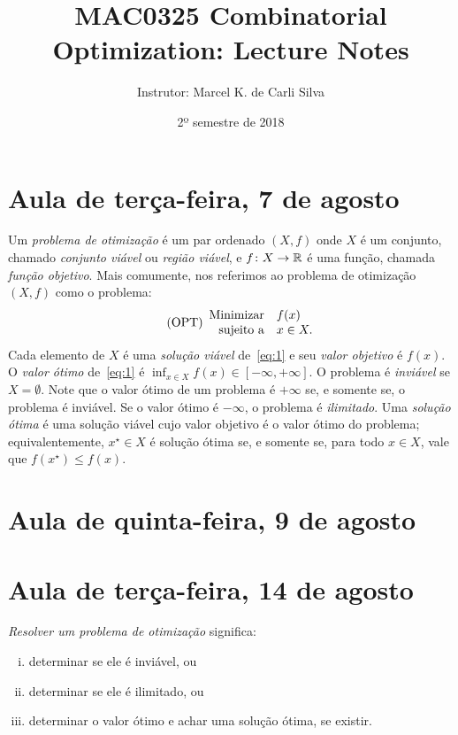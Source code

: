 \documentclass[10pt,reqno]{amsart}
\title{MAC0325 Combinatorial Optimization: Lecture Notes}
\author{Instrutor: Marcel {K.} de Carli Silva}
\date{2º semestre de 2018}
\begin{document}
\begin{abstract}

\end{abstract}

\maketitle

\tableofcontents

\section{Aula de terça-feira, 7 de agosto}

Um \emph{problema de otimização} é um par ordenado \((X,f)\) onde
\(X\) é um conjunto, chamado \emph{conjunto viável} ou \emph{região
  viável}, e \(f \colon X \to \mathbb{R}\) é uma função, chamada
\emph{função objetivo}.  Mais comumente, nos referimos ao problema de
otimização \((X,f)\) como o problema:
\begin{equation}
  \label{eq:1}
  \tag{OPT}
  \begin{array}{{rl}}
    \text{Minimizar} & f(x)     \\
    \text{sujeito a} & x \in X. \\
  \end{array}
\end{equation}
Cada elemento de \(X\) é uma \emph{solução viável} de~\eqref{eq:1} e
seu \emph{valor objetivo} é \(f(x)\).  O \emph{valor ótimo}
de~\eqref{eq:1} é \(\inf_{x \in X}f(x) \in [-\infty,+\infty]\).  O
problema é \emph{inviável} se \(X = \emptyset\).  Note que o valor
ótimo de um problema é \(+\infty\) se, e somente se, o problema é
inviável.  Se o valor ótimo é \(-\infty\), o problema é
\emph{ilimitado}.  Uma \emph{solução ótima} é uma solução viável cujo
valor objetivo é o valor ótimo do problema; equivalentemente,
\(x^{\star} \in X\) é solução ótima se, e somente se, para todo
\(x \in X\), vale que \(f(x^{\star}) \leq f(x)\).

\section{Aula de quinta-feira, 9 de agosto}

\section{Aula de terça-feira, 14 de agosto}

\emph{Resolver um problema de otimização} significa:
\begin{enumerate}[(i)]
\item determinar se ele é inviável, ou
\item determinar se ele é ilimitado, ou
\item determinar o valor ótimo e achar uma solução ótima, se existir.
\end{enumerate}
\end{document}
